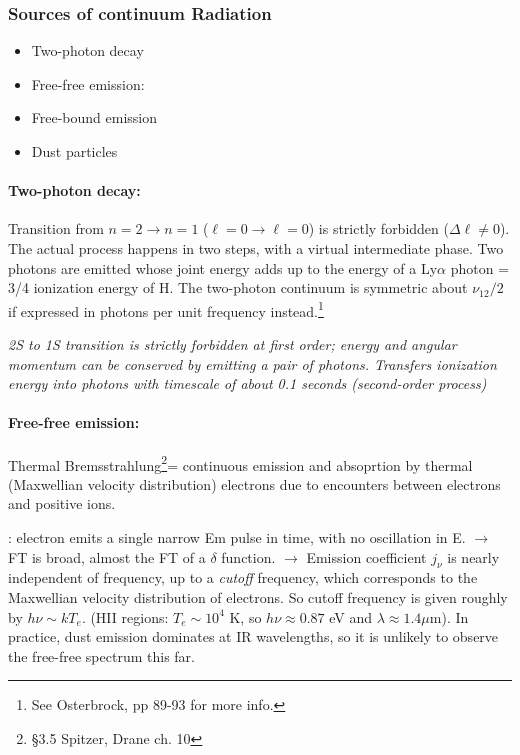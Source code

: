 \documentclass[11pt]{article}
\newcommand{\mar}[1]{\hspace{0pt}\marginpar{-\textcolor{black}{#1}-}}
\newcommand{\mynotes}[1]{{\fontfamily{cmss}\selectfont \textit{#1}}}
\begin{document}
\subsubsection{Sources of continuum Radiation}
\begin{itemize}
    \item \mar{63}Two-photon decay
    \item Free-free emission:
    \item Free-bound emission
    \item Dust particles
\end{itemize}

\paragraph{Two-photon decay:}
Transition from $n=2 \rightarrow n=1$ ($\ell=0 \rightarrow \ell=0$) is strictly
forbidden ($\Delta\ell \neq 0$). The actual process happens in two steps, with
a virtual intermediate phase. Two photons are emitted whose joint energy adds
up to the energy of a Ly$\alpha$ photon = 3/4 ionization energy of H. The
two-photon continuum is symmetric about $\nu_{12}/2$ if expressed in photons
per unit frequency instead.\footnote{See Osterbrock, pp 89-93 for more info.}

\mynotes{2S to 1S transition is strictly forbidden at first order;
energy and angular momentum can be conserved by emitting a pair of photons.
Transfers ionization energy into photons with timescale of about 0.1 seconds
(second-order process)}

\paragraph{Free-free emission:}
Thermal Bremsstrahlung\footnote{ \S{3.5}
Spitzer, Drane ch. 10}= continuous emission and absoprtion by thermal
(Maxwellian velocity distribution) electrons due to encounters between
electrons and positive ions.

\underline{}: electron emits a single narrow Em pulse
in time, with no oscillation in E. $\rightarrow$ FT is broad, almost
the FT of a $\delta$ function. $\rightarrow$ Emission coefficient
$j_{\nu}$ is nearly independent of frequency, up to a \emph{cutoff}
frequency, which corresponds to the Maxwellian velocity distribution of
electrons. \mar{64}So cutoff frequency is given roughly by $h\nu \sim
kT_{e}$. (HII regions: $T_{e} \sim 10^{4}$ K, so $h\nu \approx 0.87$ eV
and $\lambda \approx 1.4 \mu$m). In practice, dust emission dominates at
IR wavelengths, so it is unlikely to observe the free-free spectrum
this far.
\end{document}
